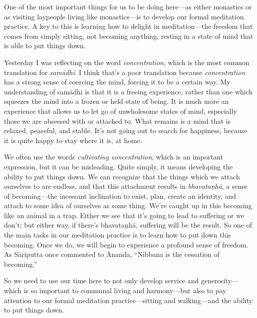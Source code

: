 
One of the most important things for us to be doing here---as either 
monastics or as visiting laypeople living like monastics---is to 
develop our formal meditation practice. A key to this is learning how 
to delight in meditation---the freedom that comes from simply sitting, 
not becoming anything, resting in a state of mind that is able to put 
things down.

Yesterday I was reflecting on the word \emph{concentration}, which is 
the most common translation for \emph{samādhi}. I think that's a poor 
translation because \emph{concentration} has a strong sense of coercing 
the mind, forcing it to be a certain way. My understanding of samādhi 
is that it is a freeing experience, rather than one which squeezes the 
mind into a frozen or held state of being. It is much more an 
experience that allows us to let go of unwholesome states of mind, 
especially those we are obsessed with or attached to. What remains is a 
mind that is relaxed, peaceful, and stable. It's not going out to 
search for happiness, because it is quite happy to stay where it is, at 
home.

We often use the words \emph{cultivating concentration}, which is an 
important expression, but it can be misleading. Quite simply, it means 
developing the ability to put things down. We can recognize that the 
things which we attach ourselves to are endless, and that this 
attachment results in \emph{bhavataṇhā}, a sense of becoming---the 
incessant inclination to exist, plan, create an identity, and attach to 
some idea of ourselves as some thing. We're caught up in this becoming 
like an animal in a trap. Either we see that it's going to lead to 
suffering or we don't; but either way, if there's bhavataṇhā, 
suffering will be the result. So one of the main tasks in our 
meditation practice is to learn how to put down this becoming. Once we 
do, we will begin to experience a profound sense of freedom. As 
Sāriputta once commented to Ānanda, ``Nibbana is the cessation of 
becoming.''

So we need to use our time here to not only develop service and 
generosity---which is so important to communal living and harmony---but 
also to pay attention to our formal meditation practice---sitting and 
walking---and the ability to put things down.

